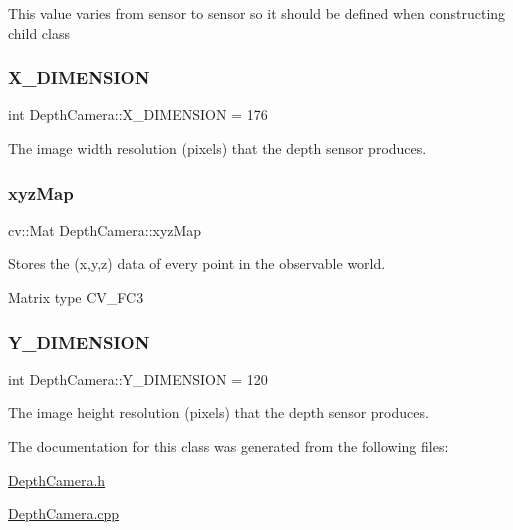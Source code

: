 This value varies from sensor to sensor so it should be defined when constructing child class \hypertarget{class_depth_camera_a6e72272880679c710fb4aaeedf1d8309}{}\label{class_depth_camera_a6e72272880679c710fb4aaeedf1d8309} 
\subsubsection{\texorpdfstring{X\+\_\+\+D\+I\+M\+E\+N\+S\+I\+ON}{X\_DIMENSION}}
{\footnotesize\ttfamily int Depth\+Camera\+::\+X\+\_\+\+D\+I\+M\+E\+N\+S\+I\+ON = 176\hspace{0.3cm}{\ttfamily [protected]}}



The image width resolution (pixels) that the depth sensor produces. 

\hypertarget{class_depth_camera_a10123e69a9879a27a2c5ae434a916a5e}{}\label{class_depth_camera_a10123e69a9879a27a2c5ae434a916a5e} 
\subsubsection{\texorpdfstring{xyz\+Map}{xyzMap}}
{\footnotesize\ttfamily cv\+::\+Mat Depth\+Camera\+::xyz\+Map\hspace{0.3cm}{\ttfamily [protected]}}



Stores the (x,y,z) data of every point in the observable world. 

Matrix type C\+V\+\_\+F\+C3 \hypertarget{class_depth_camera_a9c69a2e4d68fc09737317a638ad71f4a}{}\label{class_depth_camera_a9c69a2e4d68fc09737317a638ad71f4a} 
\subsubsection{\texorpdfstring{Y\+\_\+\+D\+I\+M\+E\+N\+S\+I\+ON}{Y\_DIMENSION}}
{\footnotesize\ttfamily int Depth\+Camera\+::\+Y\+\_\+\+D\+I\+M\+E\+N\+S\+I\+ON = 120\hspace{0.3cm}{\ttfamily [protected]}}



The image height resolution (pixels) that the depth sensor produces. 



The documentation for this class was generated from the following files\+:\begin{DoxyCompactItemize}
\item 
\hyperlink{_depth_camera_8h}{Depth\+Camera.\+h}\item 
\hyperlink{_depth_camera_8cpp}{Depth\+Camera.\+cpp}\end{DoxyCompactItemize}
